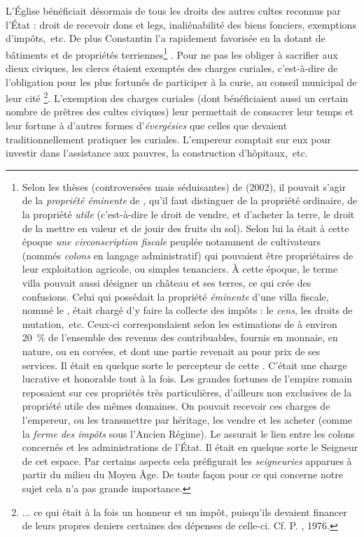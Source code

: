  L'Église bénéficiait désormais de tous les droits des autres cultes reconnus par l'État : droit de recevoir dons et legs, inaliénabilité des biens fonciers, exemptions d'impôts,~etc. De plus Constantin l'a rapidement favorisée en la dotant de bâtiments et de propriétés terriennes\footnote{Selon les thèses (controversées mais séduisantes) de  (2002), il pouvait s'agir de la \emph{propriété éminente} de , qu'il faut distinguer de la propriété ordinaire, de la propriété \emph{utile} (c'est-à-dire le droit de vendre, et d'acheter la terre, le droit de la mettre en valeur et de jouir des fruits du sol). Selon lui la  était à cette époque \emph{une circonscription fiscale} peuplée notamment de cultivateurs (nommés \emph{colons} en langage administratif) qui pouvaient être propriétaires de leur exploitation agricole, ou simples tenanciers. À cette époque, le terme villa pouvait aussi désigner un château et ses terres, ce qui crée des confusions. Celui qui possédait la propriété \emph{éminente} d'une villa fiscale, nommé le , était chargé d'y faire la collecte des impôts : le \emph{cens}, les droits de mutation,~etc. Ceux-ci correspondaient selon les estimations de  à environ 20~\% de l'ensemble des revenus des contribuables, fournis en monnaie, en nature, ou en corvées, et dont une partie revenait au  pour prix de ses services. Il était en quelque sorte le percepteur de cette . C'était une charge lucrative et honorable tout à la fois. Les grandes fortunes de l'empire romain reposaient sur ces propriétés très particulières, d'ailleurs non exclusives de la propriété utile des mêmes domaines. On pouvait recevoir ces charges de l'empereur, ou les transmettre par héritage, les vendre et les acheter (comme la \emph{ferme des impôts} sous l'Ancien Régime). Le  assurait le lien entre les colons concernés et les administrations de l'État. Il était en quelque sorte le Seigneur de cet espace. Par certains aspects cela préfigurait les \emph{seigneuries} apparues à partir du milieu du Moyen Âge. De toute façon pour ce qui concerne notre sujet cela n'a pas grande importance.}%
. Pour ne pas les obliger à sacrifier aux dieux civiques, les clercs étaient exemptés des charges curiales, c'est-à-dire de l'obligation pour les plus fortunés de participer à la curie, au conseil municipal de leur cité
\footnote{... ce qui était à la fois un honneur et un impôt, puisqu'ils devaient financer de leurs propres deniers certaines des dépenses de celle-ci. Cf. P. , 1976.}. L'exemption des charges curiales (dont bénéficiaient aussi un certain nombre de prêtres des cultes civiques) leur permettait de consacrer leur temps et leur fortune à d'autres formes d'\emph{évergésies} que celles que devaient traditionnellement pratiquer les curiales. L'empereur comptait sur eux pour investir dans l'assistance aux pauvres, la construction d'hôpitaux,~etc. 

